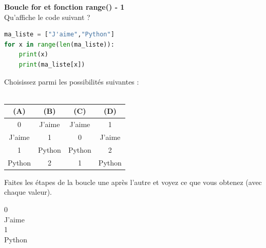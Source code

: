 	\begin{Exercice}[5 minutes] [Python] \textbf{Boucle for et fonction range() - 1}\\
      	Qu'affiche le code suivant ?
      	
      	\begin{lstlisting}[language=Python]
ma_liste = ["J'aime","Python"]
for x in range(len(ma_liste)):
    print(x)
    print(ma_liste[x]) \end{lstlisting}
             	
        Choisissez parmi les possibilités suivantes : \\ \\
        \begin{tabular}{|c|c|c|c|}
\hline
(A) & (B) & (C) & (D) \\
\hline
0 & J'aime & J'aime & 1 \\
J'aime & 1 & 0 & J'aime \\
1 & Python & Python & 2 \\
Python & 2 & 1 & Python \\
\hline
\end{tabular}
    
        \begin{conseil}
		   Faites les étapes de la boucle une après l'autre et voyez ce que vous obtenez (avec chaque valeur).  
        \end{conseil}
        
        \begin{solution}
            0\\
            J'aime\\
            1\\
            Python
            
        \end{solution}
    \end{Exercice} 		
	
